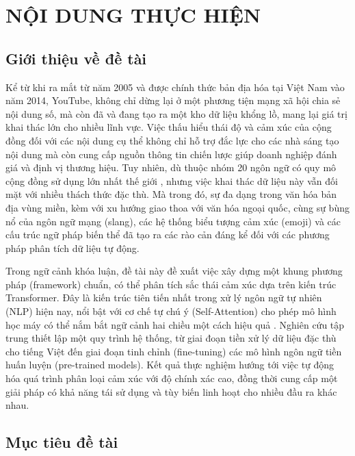 \documentclass{article}[12pt]
\begin{document}
    \section{NỘI DUNG THỰC HIỆN}
    {

    
    \subsection{Giới thiệu về đề tài}
   
    Kể từ khi ra mắt từ năm 2005 và được chính thức bản địa hóa tại Việt Nam vào năm 2014, YouTube, không chỉ dừng lại ở một phương tiện mạng xã hội chia sẻ nội dung số, mà còn đã và đang tạo ra một kho dữ liệu khổng lồ, mang lại giá trị khai thác lớn cho nhiều lĩnh vực. Việc thấu hiểu thái độ và cảm xúc của cộng đồng đối với các nội dung cụ thể không chỉ hỗ trợ đắc lực cho các nhà sáng tạo nội dung mà còn cung cấp nguồn thông tin chiến lược giúp doanh nghiệp đánh giá và định vị thương hiệu. Tuy nhiên, dù thuộc nhóm 20 ngôn ngữ có quy mô cộng đồng sử dụng lớn nhất thế giới \cite{Ethnologue2026}, nhưng việc khai thác dữ liệu này vẫn đối mặt với nhiều thách thức đặc thù. Mà trong đó, sự đa dạng trong văn hóa bản địa vùng miền, kèm với xu hướng giao thoa với văn hóa ngoại quốc, cùng sự bùng nổ của ngôn ngữ mạng (slang), các hệ thống biểu tượng cảm xúc (emoji) và các cấu trúc ngữ pháp biến thể đã tạo ra các rào cản đáng kể đối với các phương pháp phân tích dữ liệu tự động.

    Trong ngữ cảnh khóa luận, đề tài này đề xuất việc xây dựng một khung phương pháp (framework) chuẩn, có thể phân tích sắc thái cảm xúc dựa trên kiến trúc Transformer. Đây là kiến trúc tiên tiến nhất trong xử lý ngôn ngữ tự nhiên (NLP) hiện nay, nổi bật với cơ chế tự chú ý (Self-Attention) cho phép mô hình học máy có thể nắm bắt ngữ cảnh hai chiều một cách hiệu quả \cite{vaswani2017attention}. Nghiên cứu tập trung thiết lập một quy trình hệ thống, từ giai đoạn tiền xử lý dữ liệu đặc thù cho tiếng Việt đến giai đoạn tinh chỉnh (fine-tuning) các mô hình ngôn ngữ tiền huấn luyện (pre-trained models). Kết quả thực nghiệm hướng tới việc tự động hóa quá trình phân loại cảm xúc với độ chính xác cao, đồng thời cung cấp một giải pháp có khả năng tái sử dụng và tùy biến linh hoạt cho nhiều đầu ra khác nhau.

    \subsection{Mục tiêu đề tài}
    
}
\end{document}
